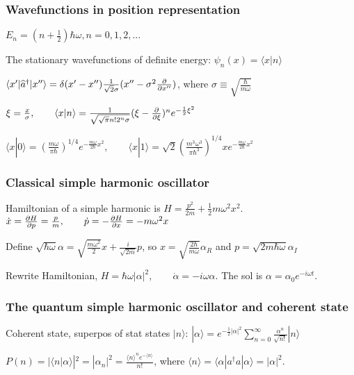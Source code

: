 \scriptsize
\subsubsection{Wavefunctions in position representation}

$E_n = (n + \frac{1}{2}) \hbar \omega, n = 0, 1, 2, ...$

The stationary wavefunctions of definite energy: $\psi_n(x) = \langle x | n \rangle$

$\langle x' | \widehat{a}^{\dag} | x'' \rangle = \delta(x' - x'') \frac{1}{\sqrt{2} \sigma} (x'' - \sigma^2 \pdv{}{x''})$, where $\sigma \equiv \sqrt{\frac{\hbar}{m \omega}}$

$\xi = \frac{x}{\sigma}, \qquad \langle x | n \rangle = \frac{1}{\sqrt{\sqrt{\pi} n! 2^n \sigma}} (\xi - \pdv{}{\xi})^n e^{-\frac{1}{2} \xi^2}$

$\langle x | 0 \rangle = (\frac{m \omega}{\pi \hbar})^{1/4} e^{-\frac{m \omega}{2 \hbar} x^2}, \qquad \langle x | 1 \rangle = \sqrt{2} (\frac{m^3 \omega^3}{\pi \hbar^3})^{1/4} x e^{-\frac{m \omega}{2 \hbar} x^2}$

\subsubsection{Classical simple harmonic oscillator}
Hamiltonian of a simple harmonic is $H = \frac{p^2}{2m} + \frac{1}{2} m \omega^2 x^2. \qquad$ 
$\dot{x} = \pdv{H}{p} = \frac{p}{m}, \qquad \dot{p} = -\pdv{H}{x} = - m \omega^2 x$

Define $\sqrt{\hbar \omega} \alpha = \sqrt{\frac{m \omega^2}{2}} x + \frac{i}{\sqrt{2m}} p$, so $x = \sqrt{\frac{2 \hbar}{m \omega}} \alpha_R$ and $p = \sqrt{2 m \hbar \omega} \alpha_I$

Rewrite Hamiltonian, $H = \hbar \omega | \alpha |^2, \qquad \dot{\alpha} = -i \omega \alpha$. The sol is $\alpha = \alpha_0 e^{-i \omega t}$.

\subsubsection{The quantum simple harmonic oscillator and coherent state}

Coherent state, superpos of stat states $|n \rangle$: $| \alpha \rangle = e^{-\frac{1}{2} |\alpha|^2} \sum_{n=0}^{\infty} \frac{\alpha^n}{\sqrt{n!}} | n \rangle$

$P(n) = |\langle n | \alpha \rangle|^2 = |\alpha_n|^2 = \frac{\langle n \rangle^n e^{-\langle n \rangle}}{n!}$, where $\langle n \rangle = \langle \alpha | a^{\dag} a | \alpha \rangle = | \alpha |^2$.

